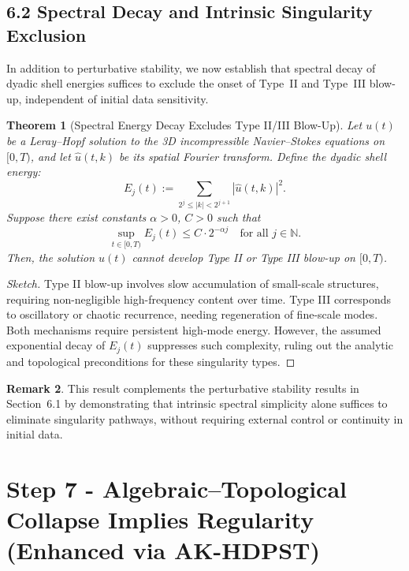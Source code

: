 \documentclass[11pt]{article}
\newtheorem{theorem}{Theorem}[section]
\theoremstyle{definition}
\newtheorem{remark}[theorem]{Remark}
\begin{document}
\subsection*{6.2 Spectral Decay and Intrinsic Singularity Exclusion}

In addition to perturbative stability, we now establish that spectral decay of dyadic shell energies suffices to exclude the onset of Type~II and Type~III blow-up, independent of initial data sensitivity.

\begin{theorem}[Spectral Energy Decay Excludes Type II/III Blow-Up]
Let \( u(t) \) be a Leray--Hopf solution to the 3D incompressible Navier--Stokes equations on \( [0,T) \), and let \( \hat{u}(t,k) \) be its spatial Fourier transform. Define the dyadic shell energy:
\[
E_j(t) := \sum_{2^j \le |k| < 2^{j+1}} |\hat{u}(t,k)|^2.
\]
Suppose there exist constants \( \alpha > 0 \), \( C > 0 \) such that
\[
\sup_{t \in [0,T)} E_j(t) \le C \cdot 2^{-\alpha j} \quad \text{for all } j \in \mathbb{N}.
\]
Then, the solution \( u(t) \) cannot develop Type II or Type III blow-up on \( [0,T) \).
\end{theorem}

\begin{proof}[Sketch]
Type II blow-up involves slow accumulation of small-scale structures, requiring non-negligible high-frequency content over time. Type III corresponds to oscillatory or chaotic recurrence, needing regeneration of fine-scale modes. Both mechanisms require persistent high-mode energy. However, the assumed exponential decay of \( E_j(t) \) suppresses such complexity, ruling out the analytic and topological preconditions for these singularity types.
\end{proof}

\begin{remark}
This result complements the perturbative stability results in Section~6.1 by demonstrating that intrinsic spectral simplicity alone suffices to eliminate singularity pathways, without requiring external control or continuity in initial data.
\end{remark}



\section{Step 7 - Algebraic--Topological Collapse Implies Regularity (Enhanced via AK-HDPST)}
\end{document}
